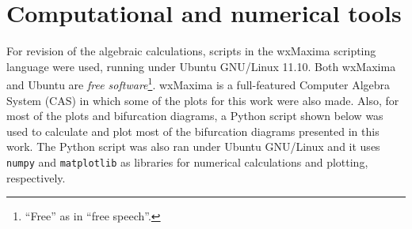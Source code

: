 \documentclass[10pt,twoside,titlepage]{book}
\numberwithin{equation}{chapter}
\numberwithin{figure}{chapter}
\numberwithin{table}{chapter}
\theoremstyle{plain}%
\theoremstyle{definition}
\theoremstyle{remark}
\begin{document}
\backmatter



\appendix
\noappendicestocpagenum
\addappheadtotoc

\chapter{Computational and numerical tools}
\label{app:numerical}

For revision of the algebraic calculations, scripts in the wxMaxima scripting language were used, running under Ubuntu GNU/Linux 11.10. Both wxMaxima and Ubuntu are \emph{free software}\footnote{``Free'' as in ``free speech''.}. wxMaxima is a full-featured Computer Algebra System (CAS) in which some of the plots for this work were also made. Also, for most of the plots and bifurcation diagrams, a Python script shown below was used to calculate and plot most of the bifurcation diagrams presented in this work. The Python script was also ran under Ubuntu GNU/Linux and it uses \texttt{numpy} and \texttt{matplotlib} as libraries for numerical calculations and plotting, respectively.
\end{document}
